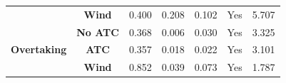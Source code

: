\begin{table}
\begin{tabular}{ccccccc}
                                                                                                        & \textbf{Wind}                   & 0.400                 & 0.208                 & 0.102                        & Yes                                                                                                   & 5.707                                                                                                    \\ 
        \cline{2-7}
        \multirow{3}{*}{\textbf{Overtaking}}                                                            & \textbf{No ATC}                 & 0.368            & 0.006            & 0.030                   & Yes                                                                                                & 3.325                                                                                               \\
                                                                                                        & \textbf{ATC}                    & 0.357            & 0.018            & 0.022                   & Yes                                                                                                & 3.101                                                                                               \\
                                                                                                        & \textbf{Wind}                   & 0.852            & 0.039            & 0.073                   & Yes                                                                                                & 1.787                                                                                               \\
        \bottomrule
        \end{tabular}
        \end{table}
